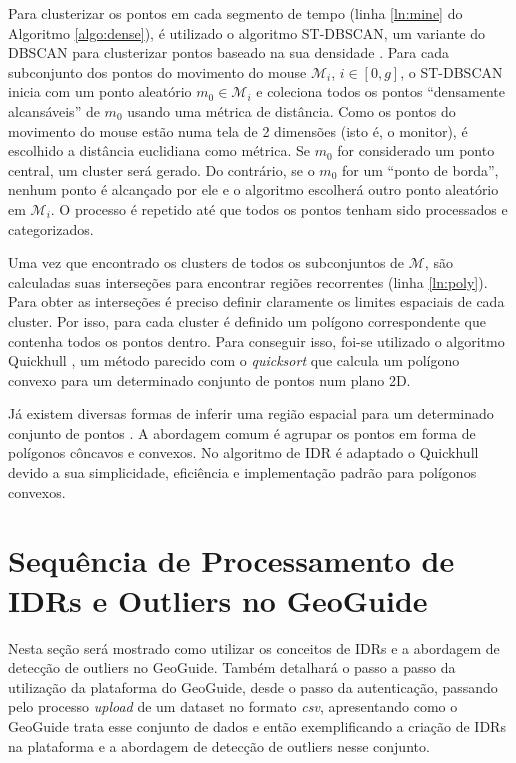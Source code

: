 Para clusterizar os pontos em cada segmento de tempo (linha \ref{ln:mine} do Algoritmo \ref{algo:dense}), é utilizado o algoritmo ST-DBSCAN, um variante do DBSCAN para clusterizar pontos baseado na sua densidade \cite{Birant:2007}. Para cada subconjunto dos pontos do movimento do mouse $\mathcal{M}_i$, $i \in [0,g]$, o ST-DBSCAN inicia com um ponto aleatório $m_0 \in \mathcal{M}_i$ e coleciona todos os pontos ``densamente alcansáveis'' de $m_0$ usando uma métrica de distância. Como os pontos do movimento do mouse estão numa tela de 2 dimensões (isto é, o monitor), é escolhido a distância euclidiana como métrica. Se $m_0$ for considerado um ponto central,  um cluster será gerado. Do contrário, se o $m_0$ for um ``ponto de borda'', nenhum ponto é alcançado por ele e o algoritmo escolherá outro ponto aleatório em $\mathcal{M}_i$. O processo é repetido até que todos os pontos tenham sido processados e categorizados.

Uma vez que encontrado os clusters de todos os subconjuntos de $\mathcal{M}$, são calculadas suas interseções para encontrar regiões recorrentes (linha \ref{ln:poly}). Para obter as interseções é preciso definir claramente os limites espaciais de cada cluster. Por isso, para cada cluster é definido um polígono correspondente que contenha todos os pontos dentro. Para conseguir isso, foi-se utilizado o algoritmo Quickhull \cite{Barber:1996}, um método parecido com o \textit{quicksort} que calcula um polígono convexo para um determinado conjunto de pontos num plano 2D.

Já existem diversas formas de inferir uma região espacial para um determinado conjunto de pontos \cite{Bevis1989,DUCKHAM2008,FADILI2004,ARAMPATZIS2006,Galton2006}. A abordagem comum é agrupar os pontos em forma de polígonos côncavos e convexos. No algoritmo de IDR é adaptado o Quickhull devido a sua simplicidade, eficiência e implementação padrão para polígonos convexos.

\section{Sequência de Processamento de IDRs e Outliers no GeoGuide}

Nesta seção será mostrado como utilizar os conceitos de IDRs e a abordagem de detecção de outliers no GeoGuide. Também detalhará o passo a passo da utilização da plataforma do GeoGuide, desde o passo da autenticação, passando pelo processo \textit{upload} de um dataset no formato \textit{csv}, apresentando como o GeoGuide trata esse conjunto de dados e então exemplificando a criação de IDRs na plataforma e a abordagem de detecção de outliers nesse conjunto.

